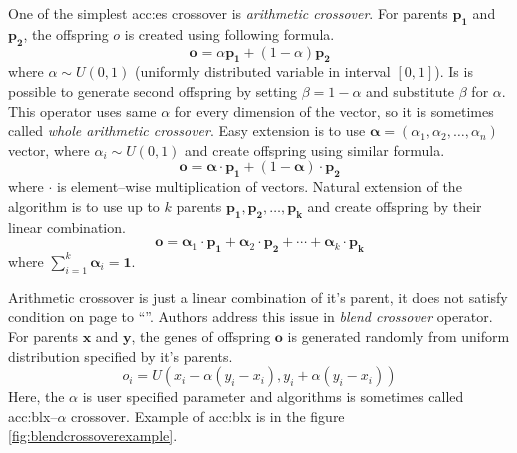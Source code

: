 One of the simplest \acrshort{acc:es} crossover is \emph{arithmetic crossover}. For parents $\mathbf{p_1}$ and $\mathbf{p_2}$, the offspring $o$ is created using following formula.
$$
\mathbf{o} = \alpha\mathbf{p_1}+\left(1-\alpha\right)\mathbf{p_2}
$$
where $\alpha \sim U(0,1)$ (uniformly distributed variable in interval $\left[0,1\right]$). Is is possible to generate second offspring by setting $\beta=1-\alpha$ and substitute $\beta$ for $\alpha$. This operator uses same $\alpha$ for every dimension of the vector, so it is sometimes called \emph{whole arithmetic crossover}. Easy extension is to use $\boldsymbol{\alpha}=(\alpha_1,\alpha_2,\dots,\alpha_n)$ vector, where $\alpha_i\sim U(0,1)$ and create offspring using similar formula.
$$
\mathbf{o} = \boldsymbol{\alpha}\cdot\mathbf{p_1}+\left(1-\boldsymbol{\alpha}\right)\cdot\mathbf{p_2}
$$
where $\cdot$ is element--wise multiplication of vectors.
Natural extension of the algorithm is to use up to $k$ parents $\mathbf{p_1}, \mathbf{p_2},\dots,\mathbf{p_k}$ and create offspring by their linear combination.
$$
\mathbf{o} = 
\boldsymbol{\alpha}_1\cdot\mathbf{p_1}+
\boldsymbol{\alpha}_2\cdot\mathbf{p_2}+
\cdots +
\boldsymbol{\alpha}_k\cdot\mathbf{p_k}
$$
where $\sum_{i=1}^{k}\boldsymbol{\alpha}_i=\boldsymbol{1}$.

Arithmetic crossover is just a linear combination of it's parent, it does not satisfy condition on page \pageref{enum:espopulationvariance} to \enquote{\snipescondition}. Authors \citeauthor*{BlendCrossoverOriginal} address this issue in \emph{blend crossover} operator. For parents $\mathbf{x}$ and $\mathbf{y}$, the genes of offspring $\mathbf{o}$ is generated randomly from uniform distribution specified by it's parents.
$$
o_i = U\left( 
    x_i - \alpha \left( y_i - x_i \right),
    y_i + \alpha \left( y_i - x_i \right)
\right)
$$
Here, the $\alpha$ is user specified parameter and algorithms is sometimes called \acrshort{acc:blx}--$\alpha$ crossover. Example of \acrshort{acc:blx} is in the figure \ref{fig:blendcrossoverexample}.

